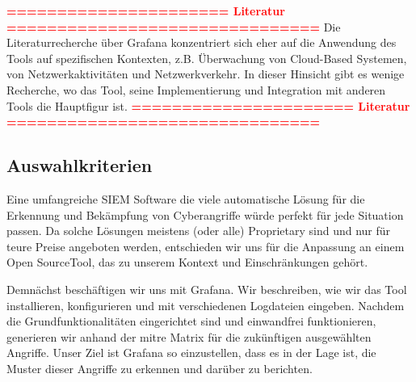 \textcolor{red}{\textbf{====================== Literatur ===============================}}
Die Literaturrecherche über Grafana konzentriert sich eher auf die Anwendung des Tools auf spezifischen Kontexten, z.B. Überwachung von Cloud-Based Systemen, von Netzwerkaktivitäten und Netzwerkverkehr. In dieser Hinsicht gibt es wenige Recherche, wo das Tool, seine Implementierung und Integration mit anderen Tools die Hauptfigur ist.
\textcolor{red}{\textbf{====================== Literatur ===============================}}

\subsection{Auswahlkriterien}
Eine umfangreiche \gls{SIEM} Software die viele automatische Lösung für die Erkennung und Bekämpfung von Cyberangriffe würde perfekt für jede Situation passen. Da solche Lösungen meistens (oder alle) \gls{Proprietary} sind und nur für teure Preise angeboten werden, entschieden wir uns für die Anpassung an einem \gls{Open Source}Tool, das zu unserem Kontext und Einschränkungen gehört. 

Demnächst beschäftigen wir uns mit Grafana. Wir beschreiben, wie wir das Tool installieren, konfigurieren und mit verschiedenen Logdateien eingeben. Nachdem die Grundfunktionalitäten eingerichtet sind und einwandfrei funktionieren, generieren wir anhand der \gls{mitre} Matrix  für die zukünftigen ausgewählten Angriffe. Unser Ziel ist Grafana so einzustellen, dass es in der Lage ist, die Muster dieser Angriffe zu erkennen und darüber zu berichten.

